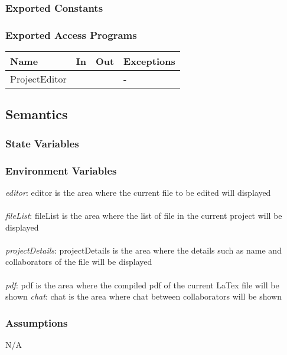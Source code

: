 \documentclass[12pt, titlepage]{article}
\begin{document}
	\subsubsection{Exported Constants}
	
	\subsubsection{Exported Access Programs}
	
	\begin{center}
		\begin{tabular}{p{2cm} p{4cm} p{4cm} p{2cm}}
			\hline
			\textbf{Name} & \textbf{In} & \textbf{Out} & \textbf{Exceptions} \\
			\hline
			ProjectEditor &  &  & - \\
			\hline
		\end{tabular}
	\end{center}
	
	\subsection{Semantics}
	
	\subsubsection{State Variables}
	
	
	\subsubsection{Environment Variables}
	
	\textit{editor}: editor is the area where the current file to be edited will displayed \\\\ 
	\textit{fileList}: fileList is the area where the list of file in the current project will be displayed \\\\
	\textit{projectDetails}: projectDetails is the area where the details such as name and collaborators of the file will be displayed \\\\
	\textit{pdf}: pdf is the area where the compiled pdf of the current LaTex file will be shown \textit{chat}: chat is the area where chat between collaborators will be shown 
	
	\subsubsection{Assumptions}
	N/A
	
\end{document}
